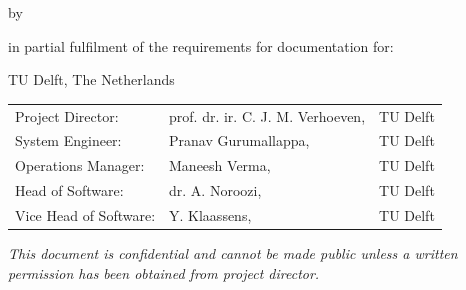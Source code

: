 \begin{titlepage}


\begin{center}


{\makeatletter
\largetitlestyle\fontsize{64}{94}\selectfont\@title
\makeatother}

{\makeatletter
\ifx\@subtitle\undefined\else
    \bigskip
   {\tudsffamily\fontsize{22}{32}\selectfont\@subtitle}
\fi
\makeatother}

\bigskip
\bigskip

by

\bigskip
\bigskip

{\makeatletter
\largetitlestyle\fontsize{26}{26}\selectfont\@author
\makeatother}

\bigskip
\bigskip

in partial fulfilment of the requirements for documentation for:

TU Delft, The Netherlands


\vfill

\begin{tabular}{lll}
    Project Director: & prof. dr. ir. C. J. M. Verhoeven, & TU Delft \\
    System Engineer: & Pranav Gurumallappa, & TU Delft \\
    Operations Manager: & Maneesh Verma, & TU Delft \\
    Head of Software: & dr. A. Noroozi, & TU Delft \\
    Vice Head of Software: & Y. Klaassens, & TU Delft \\
\end{tabular}

\bigskip
\bigskip
\emph{This document is confidential and cannot be made public unless a written permission has been obtained from project director.
}


\end{center}
\end{titlepage}
